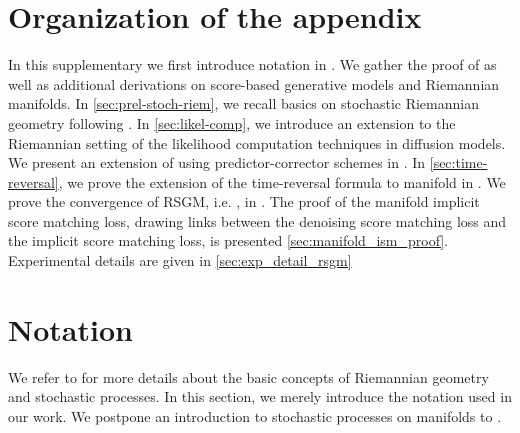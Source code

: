 \section*{Organization of the appendix}
\label{sec:organ-suppl}

In this supplementary we first introduce notation in .
We gather the proof of  as well as additional derivations on score-based generative models and Riemannian manifolds.
In \cref{sec:prel-stoch-riem}, we recall basics on stochastic Riemannian geometry following \textcite{hsu2002stochastic}.
In \cref{sec:likel-comp}, we introduce an extension to the Riemannian setting of the likelihood computation techniques in diffusion models.
We present an extension of  using predictor-corrector schemes in .
In \cref{sec:time-reversal}, we prove the extension of the time-reversal formula to manifold in .
We prove the convergence of RSGM, i.e. , in .
The proof of the manifold implicit score matching loss, drawing links between the denoising score matching loss and the implicit score matching loss, is presented \cref{sec:manifold_ism_proof}.
Experimental details are given in \cref{sec:exp_detail_rsgm}

\section{Notation}
\label{sec:notation-1}

We refer to  for more details about the basic concepts of Riemannian geometry and stochastic processes.
In this section, we merely introduce the notation used in our work.
We postpone an introduction to stochastic processes on manifolds to .

